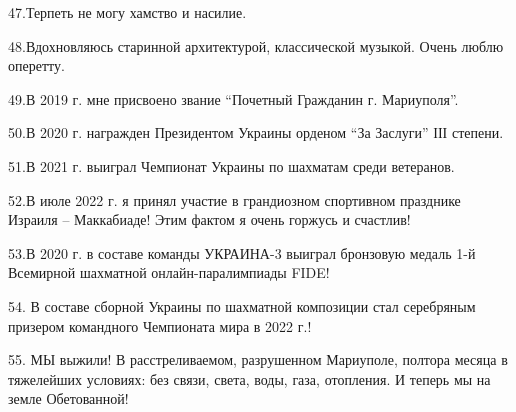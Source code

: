 47.Терпеть не могу хамство и насилие.

48.Вдохновляюсь старинной архитектурой, классической музыкой. Очень люблю
оперетту.

49.В 2019 г. мне присвоено звание \enquote{Почетный Гражданин г. Мариуполя}.

50.В 2020 г. награжден Президентом Украины орденом \enquote{За Заслуги} ІІІ степени. 

51.В 2021 г. выиграл Чемпионат Украины по шахматам среди ветеранов.

52.В июле 2022 г. я принял участие в грандиозном спортивном празднике Израиля –
Маккабиаде! Этим фактом я очень горжусь и счастлив!

53.В 2020 г. в составе команды УКРАИНА-3 выиграл бронзовую медаль 1-й Всемирной
шахматной онлайн-паралимпиады FIDE!

54. В составе сборной Украины по шахматной композиции стал серебряным призером
командного Чемпионата мира в 2022 г.!

55. МЫ выжили! В расстреливаемом, разрушенном Мариуполе, полтора месяца в
тяжелейших условиях: без связи, света, воды, газа, отопления. И теперь мы на
земле Обетованной!

